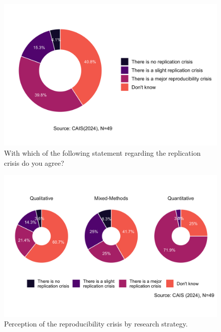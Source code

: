 \documentclass[
  letterpaper,
  DIV=11,
  numbers=noendperiod]{scrartcl}
\begin{document}
\begin{figure}[H]

{\centering \includegraphics{paper_files/figure-pdf/fig-dona-1.png}

}

\caption{\label{fig-dona}With which of the following statement regarding
the replication crisis do you agree?}

\end{figure}

\begin{figure}[H]

{\centering \includegraphics{paper_files/figure-pdf/fig-dona-grid-1.png}

}

\caption{\label{fig-dona-grid}Perception of the reproducibility crisis
by research strategy.}

\end{figure}
\end{document}
